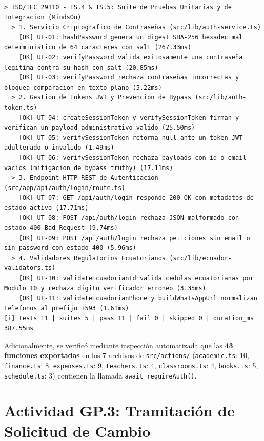 \documentclass[11pt,a4paper]{article}
\begin{document}
\begin{lstlisting}[caption={Salida Real de Ejecución de Pruebas Unitarias (\texttt{npx tsx --test src/\_\_tests\_\_/iso29110-security-auth.test.ts})}]
> ISO/IEC 29110 - IS.4 & IS.5: Suite de Pruebas Unitarias y de Integracion (MindsOn)
  > 1. Servicio Criptografico de Contraseñas (src/lib/auth-service.ts)
    [OK] UT-01: hashPassword genera un digest SHA-256 hexadecimal deterministico de 64 caracteres con salt (267.33ms)
    [OK] UT-02: verifyPassword valida exitosamente una contraseña legitima contra su hash con salt (20.85ms)
    [OK] UT-03: verifyPassword rechaza contraseñas incorrectas y bloquea comparacion en texto plano (5.22ms)
  > 2. Gestion de Tokens JWT y Prevencion de Bypass (src/lib/auth-token.ts)
    [OK] UT-04: createSessionToken y verifySessionToken firman y verifican un payload administrativo valido (25.50ms)
    [OK] UT-05: verifySessionToken retorna null ante un token JWT adulterado o invalido (1.49ms)
    [OK] UT-06: verifySessionToken rechaza payloads con id o email vacios (mitigacion de bypass truthy) (17.11ms)
  > 3. Endpoint HTTP REST de Autenticacion (src/app/api/auth/login/route.ts)
    [OK] UT-07: GET /api/auth/login responde 200 OK con metadatos de estado activo (17.71ms)
    [OK] UT-08: POST /api/auth/login rechaza JSON malformado con estado 400 Bad Request (9.74ms)
    [OK] UT-09: POST /api/auth/login rechaza peticiones sin email o sin password con estado 400 (5.96ms)
  > 4. Validadores Regulatorios Ecuatorianos (src/lib/ecuador-validators.ts)
    [OK] UT-10: validateEcuadorianId valida cedulas ecuatorianas por Modulo 10 y rechaza digito verificador erroneo (3.35ms)
    [OK] UT-11: validateEcuadorianPhone y buildWhatsAppUrl normalizan telefonos al prefijo +593 (1.61ms)
[i] tests 11 | suites 5 | pass 11 | fail 0 | skipped 0 | duration_ms 387.55ms
\end{lstlisting}

Adicionalmente, se verificó mediante inspección automatizada que las \textbf{43 funciones exportadas} en los 7 archivos de \texttt{src/actions/} (\texttt{academic.ts}: 10, \texttt{finance.ts}: 8, \texttt{expenses.ts}: 9, \texttt{teachers.ts}: 4, \texttt{classrooms.ts}: 4, \texttt{books.ts}: 5, \texttt{schedule.ts}: 3) contienen la llamada \texttt{await requireAuth()}.

\section{Actividad GP.3: Tramitación de Solicitud de Cambio}
\end{document}
